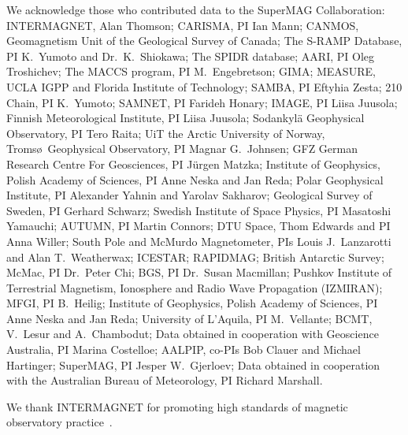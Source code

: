 \documentclass[amsmath,amssymb,aps,10pt,prd,letterpaper,nofootinbib,balancelastpage,notitlepage,superscriptaddress,twocolumn,floatfix]{revtex4-2}
\begin{document}
We acknowledge those who contributed data to the SuperMAG Collaboration: 
INTERMAGNET, Alan Thomson; 
CARISMA, PI Ian Mann; 
CANMOS, Geomagnetism Unit of the Geological Survey of Canada; 
The S-RAMP Database, PI K.~Yumoto and Dr.~K.~Shiokawa; 
The SPIDR database; AARI, PI Oleg Troshichev; 
The MACCS program, PI M.~Engebretson; 
GIMA; 
MEASURE, UCLA IGPP and Florida Institute of Technology; 
SAMBA, PI Eftyhia Zesta; 
210 Chain, PI K.~Yumoto; 
SAMNET, PI Farideh Honary; 
IMAGE, PI Liisa Juusola; 
Finnish Meteorological Institute, PI Liisa Juusola; 
Sodankylä Geophysical Observatory, PI Tero Raita; 
UiT the Arctic University of Norway, Troms\o\ Geophysical Observatory, PI Magnar G.~Johnsen; 
GFZ German Research Centre For Geosciences, PI J\"urgen Matzka; 
Institute of Geophysics, Polish Academy of Sciences, PI Anne Neska and Jan Reda; 
Polar Geophysical Institute, PI Alexander Yahnin and Yarolav Sakharov; 
Geological Survey of Sweden, PI Gerhard Schwarz; 
Swedish Institute of Space Physics, PI Masatoshi Yamauchi; 
AUTUMN, PI Martin Connors; 
DTU Space, Thom Edwards and PI Anna Willer; 
South Pole and McMurdo Magnetometer, PIs Louis J.~Lanzarotti and Alan T.~Weatherwax; 
ICESTAR; 
RAPIDMAG; 
British Antarctic Survey; 
McMac, PI Dr.~Peter Chi; 
BGS, PI Dr.~Susan Macmillan; 
Pushkov Institute of Terrestrial Magnetism, Ionosphere and Radio Wave Propagation (IZMIRAN); 
MFGI, PI B.~Heilig; 
Institute of Geophysics, Polish Academy of Sciences, PI Anne Neska and Jan Reda; 
University of L’Aquila, PI M.~Vellante; 
BCMT, V.~Lesur and A.~Chambodut; 
Data obtained in cooperation with Geoscience Australia, PI Marina Costelloe; 
AALPIP, co-PIs Bob Clauer and Michael Hartinger; 
SuperMAG, PI Jesper W.~Gjerloev; 
Data obtained in cooperation with the Australian Bureau of Meteorology, PI Richard Marshall.

We thank INTERMAGNET for promoting high standards of magnetic observatory practice~\cite{INTERMAGNETwebsite}.


\appendix
\end{document}
